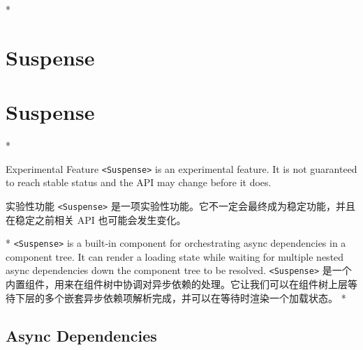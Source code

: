 
\begin{paracol}{2}
 
\switchcolumn[0]*%
\section{Suspense}
\switchcolumn
\section{Suspense}
\switchcolumn[0]*%
\begin{vueQuote}{Experimental Feature}
\texttt{\textless{}Suspense\textgreater{}} is an experimental feature.
It is not guaranteed to reach stable status and the API may change
before it does.
\end{vueQuote} 
\switchcolumn
\begin{vueQuote}{实验性功能}
\texttt{\textless{}Suspense\textgreater{}}
是一项实验性功能。它不一定会最终成为稳定功能，并且在稳定之前相关 API
也可能会发生变化。
\end{vueQuote} 
\switchcolumn[0]*%
\texttt{\textless{}Suspense\textgreater{}} is a built-in component for
orchestrating async dependencies in a component tree. It can render a
loading state while waiting for multiple nested async dependencies down
the component tree to be resolved.
\switchcolumn
\texttt{\textless{}Suspense\textgreater{}}
是一个内置组件，用来在组件树中协调对异步依赖的处理。它让我们可以在组件树上层等待下层的多个嵌套异步依赖项解析完成，并可以在等待时渲染一个加载状态。
\switchcolumn[0]*%
\subsection{Async Dependencies}
\switchcolumn

\end{paracol}
